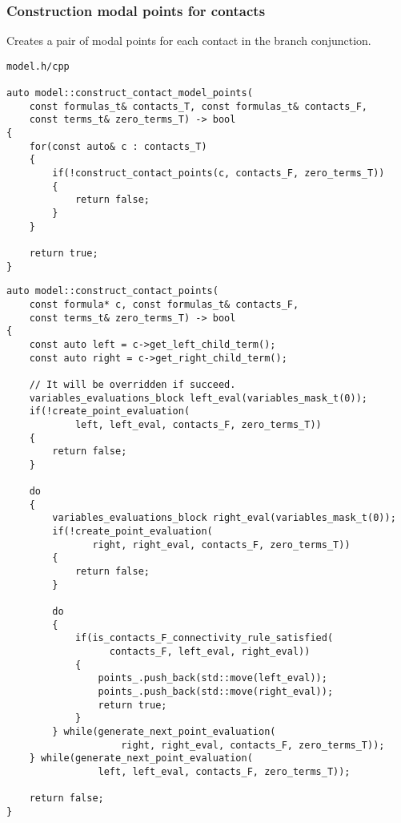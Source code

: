 \documentclass{article}
\begin{document}
	\newpage
	\subsubsection*{Construction modal points for contacts}
	Creates a pair of modal points for each contact in the branch conjunction.
\\
\begin{lstlisting}
model.h/cpp

auto model::construct_contact_model_points(
	const formulas_t& contacts_T, const formulas_t& contacts_F,
	const terms_t& zero_terms_T) -> bool
{
    for(const auto& c : contacts_T)
    {
        if(!construct_contact_points(c, contacts_F, zero_terms_T))
        {
            return false;
        }
    }

    return true;
}
\end{lstlisting}
\newpage
\begin{lstlisting}
auto model::construct_contact_points(
	const formula* c, const formulas_t& contacts_F,
	const terms_t& zero_terms_T) -> bool
{
    const auto left = c->get_left_child_term();
    const auto right = c->get_right_child_term();

    // It will be overridden if succeed.
    variables_evaluations_block left_eval(variables_mask_t(0));
    if(!create_point_evaluation(
            left, left_eval, contacts_F, zero_terms_T))
    {
        return false;
    }

    do
    {
        variables_evaluations_block right_eval(variables_mask_t(0));
        if(!create_point_evaluation(
               right, right_eval, contacts_F, zero_terms_T))
        {
            return false;
        }

        do
        {
            if(is_contacts_F_connectivity_rule_satisfied(
                  contacts_F, left_eval, right_eval))
            {
                points_.push_back(std::move(left_eval));
                points_.push_back(std::move(right_eval));
                return true;
            }
        } while(generate_next_point_evaluation(
                    right, right_eval, contacts_F, zero_terms_T));
    } while(generate_next_point_evaluation(
                left, left_eval, contacts_F, zero_terms_T));

    return false;
}
\end{lstlisting}

	\newpage
\end{document}
